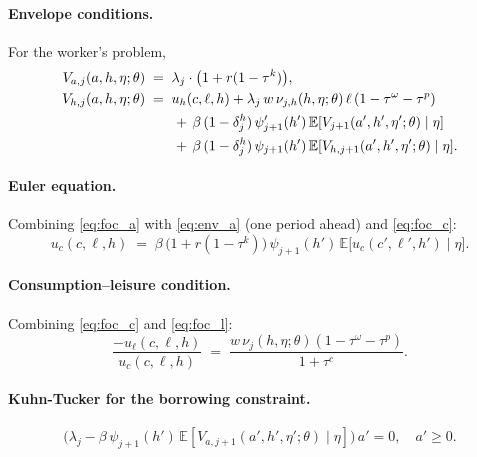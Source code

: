 \documentclass[12pt,a4paper]{article}
\newcommand{\E}{\mathbb{E}}
\begin{document}
\paragraph{Envelope conditions.} For the worker's problem,
\begin{align}
V_{a, j}(a, h, \eta; \theta) &\;=\; \lambda_j \cdot \bigl(1 + r(1-\tau^k)\bigr), \label{eq:env_a}\\
V_{h, j}(a, h, \eta; \theta) &\;=\; u_h(c, \ell, h) + \lambda_j\, w\, \nu_{j,h}(h, \eta; \theta)\, \ell\, (1-\tau^\omega-\tau^p) \notag\\
&\qquad +\, \beta\, (1-\delta_j^h)\, \psi_{j+1}'(h')\, \E[V_{j+1}(a', h', \eta'; \theta) \mid \eta] \notag\\
&\qquad +\, \beta\, (1-\delta_j^h)\, \psi_{j+1}(h')\, \E[V_{h, j+1}(a', h', \eta'; \theta) \mid \eta]. \label{eq:env_h}
\end{align}

\paragraph{Euler equation.} Combining \eqref{eq:foc_a} with \eqref{eq:env_a} (one period ahead) and \eqref{eq:foc_c}:
\begin{equation}
\label{eq:euler}
u_c(c, \ell, h) \;=\; \beta\, \bigl(1 + r(1-\tau^k)\bigr)\, \psi_{j+1}(h')\, \E\bigl[u_c(c', \ell', h') \mid \eta\bigr].
\end{equation}
 
\paragraph{Consumption--leisure condition.} Combining \eqref{eq:foc_c} and \eqref{eq:foc_l}:
\begin{equation}
\label{eq:cons_leisure}
\frac{-u_\ell(c, \ell, h)}{u_c(c, \ell, h)}
\;=\;
\frac{w\, \nu_j(h, \eta; \theta)(1-\tau^\omega-\tau^p)}{1 + \tau^c}.
\end{equation}
 
\paragraph{Kuhn-Tucker for the borrowing constraint.}
\begin{equation}
\bigl(\lambda_j - \beta\, \psi_{j+1}(h')\, \E[V_{a, j+1}(a', h', \eta'; \theta) \mid \eta]\bigr)\, a' = 0,\quad a' \geq 0.
\end{equation}
 
\end{document}
